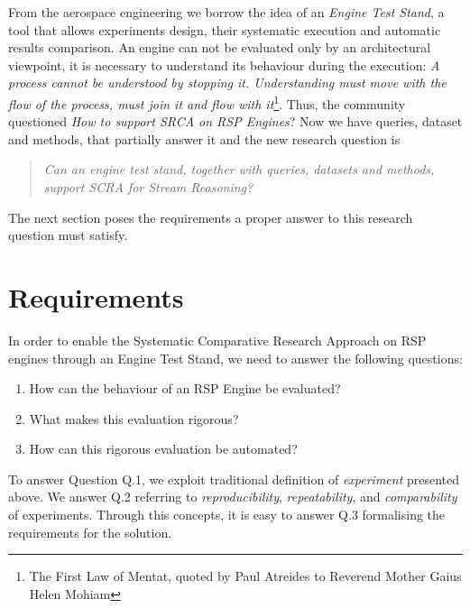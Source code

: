 From the aerospace engineering we borrow the idea of an \textit{Engine Test Stand}, a tool that allows experiments design, their systematic execution and automatic results comparison. An engine can not be evaluated only by an architectural viewpoint, it is necessary to understand its behaviour during the execution: \textit{A process cannot be understood by stopping it. Understanding must move with the flow of the process, must join it and flow with it}\footnote{The First Law of Mentat, quoted by Paul Atreides to Reverend Mother Gaius Helen Mohiam}. Thus, the community questioned \textit{How to support SRCA on RSP Engines}? Now we have queries, dataset and methods, that partially answer it and the new research question is \begin{quote}
\textit{Can an engine test stand, together with queries, datasets and methods, support SCRA for Stream Reasoning?}
\end{quote} The next section poses the requirements a proper answer to this research question must satisfy.

\section{Requirements} \label{sec:requirements}

In order to enable the Systematic Comparative Research Approach on RSP engines through an Engine Test Stand, we need to answer the following questions: 
\begin{enumerate}
\item[Q.1] How can the behaviour of an RSP Engine be evaluated? 
\item[Q.2] What makes this evaluation rigorous? 
\item[Q.3] How can this rigorous evaluation be automated?
\end{enumerate} To answer Question Q.1, we exploit traditional definition of \textit{experiment} presented above. We answer Q.2 referring to \textit{reproducibility}, \textit{repeatability}, and \textit{comparability} of experiments. Through this concepts, it is easy to answer Q.3 formalising the requirements for the solution.

